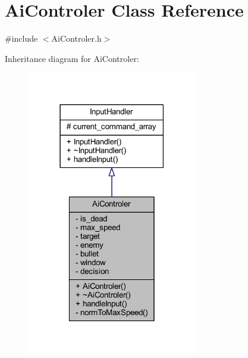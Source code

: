 \hypertarget{class_ai_controler}{}\section{Ai\+Controler Class Reference}
\label{class_ai_controler}


{\ttfamily \#include $<$Ai\+Controler.\+h$>$}



Inheritance diagram for Ai\+Controler\+:
\nopagebreak
\begin{figure}[H]
\begin{center}
\leavevmode
\includegraphics[width=210pt]{class_ai_controler__inherit__graph}
\end{center}
\end{figure}


